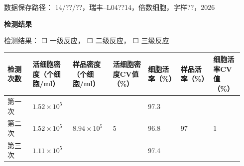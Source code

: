 \documentclass[UTF8,10pt,a4paper,fontset=fandol]{ctexart}
\newcommand{\fieldvalue}[1]{#1}
\newcommand{\handwritten}[1]{#1}
\newcommand{\checkboxfield}[1]{\ifstrequal{#1}{checked}{☑}{\ifstrequal{#1}{unclear}{?}{☐}}}
\begin{document}
\vspace{4pt}

\noindent
数据保存路径：
\fieldvalue{\handwritten{14/??/??，瑞丰--L04??14，倍数细胞，字样??，2026}}

\vspace{4pt}
\noindent\textbf{检测结果}

\noindent
检测结果：
\fieldvalue{\checkboxfield{unchecked}} 一级反应，
\fieldvalue{\checkboxfield{unchecked}} 二级反应，
\fieldvalue{\checkboxfield{unchecked}} 三级反应

\vspace{3pt}

\small
\begin{tabular}{|p{0.10\linewidth}|p{0.16\linewidth}|p{0.16\linewidth}|p{0.14\linewidth}|p{0.13\linewidth}|p{0.13\linewidth}|p{0.12\linewidth}|}
\hline
检测次数 & 活细胞密度（个细胞/ml） & 样品密度（个细胞/ml） & 活细胞密度CV值（\%） & 细胞活率（\%） & 样品活率（\%） & 细胞活率CV值（\%）\\
\hline
第一次 &
\fieldvalue{\handwritten{$1.52\times10^{5}$}} &
& &
\fieldvalue{\handwritten{97.3}} &
& \\
\hline
第二次 &
\fieldvalue{\handwritten{$1.52\times10^{5}$}} &
\fieldvalue{\handwritten{$8.94\times10^{5}$}} &
\fieldvalue{\handwritten{5}} &
\fieldvalue{\handwritten{96.8}} &
\fieldvalue{\handwritten{97}} &
\fieldvalue{\handwritten{1}} \\
\hline
第三次 &
\fieldvalue{\handwritten{$1.11\times10^{5}$}} &
& &
\fieldvalue{\handwritten{97.4}} &
& \\
\hline
\end{tabular}
\end{document}
